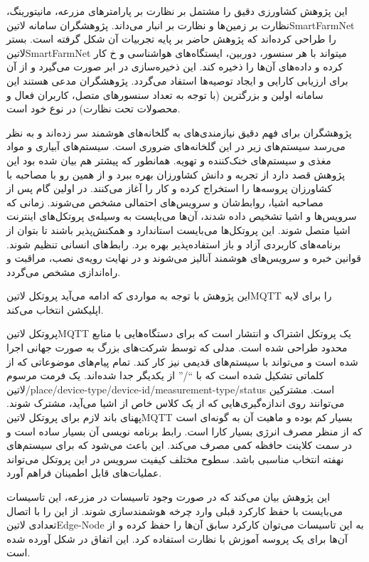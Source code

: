 این پژوهش کشاورزی دقیق را مشتمل بر نظارت بر پارامترهای مزرعه، مانیتورینگ، نظارت بر زمین‌ها و نظارت بر انبار می‌داند. پژوهشگران سامانه ‌لاتین{SmartFarmNet} را طراحی کرده‌اند که پژوهش حاضر بر پایه تجربیات آن شکل گرفته است.
بستر ‌لاتین{SmartFarmNet} میتواند با هر سنسور، دوربین، ایستگاه‌های هواشناسی و ‌خ کار کرده و داده‌های آن‌ها را ذخیره کند. این ذخیره‌سازی در ابر صورت می‌گیرد و از آن برای ارزیابی کارایی و ایجاد توصیه‌ها استفاد می‌گردد.
پژوهشگران مدعی هستند این سامانه اولین و بزرگترین (با توجه به تعداد سنسورهای متصل، کاربران فعال و محصولات تحت نظارت) در نوع خود است.

پژوهشگران برای فهم دقیق نیازمندی‌های به گلخانه‌های هوشمند سر زده‌اند و به نظر می‌رسد سیستم‌های زیر در این گلخانه‌های ضروری است. سیستم‌های آبیاری و مواد مغذی و سیستم‌های خنک‌کننده و تهویه.
همانطور که پیشتر هم بیان شده بود این پژوهش قصد دارد از تجربه و دانش کشاورزان بهره ببرد و از همین رو با مصاحبه با کشاورزان پروسه‌ها را استخراج کرده و کار را آغاز می‌کنند.
در اولین گام پس از مصاحبه اشیا، روابط‌شان و سرویس‌های احتمالی مشخص می‌شوند. زمانی که سرویس‌ها و اشیا تشخیص داده شدند، آن‌ها می‌بایست به وسیله‌ی پروتکل‌های اینترنت اشیا متصل شوند.
این پروتکل‌ها می‌بایست استاندارد و همکنش‌پذیر باشند تا بتوان از برنامه‌های کاربردی آزاد و باز استفاده‌پذیر بهره برد.
رابط‌های انسانی تنظیم شوند.
قوانین خبره و سرویس‌های هوشمند آنالیز می‌شوند و در نهایت رویه‌ی نصب، مراقبت و راه‌اندازی مشخص می‌گردد.

این پژوهش با توجه به مواردی که ادامه می‌آید پروتکل ‌لاتین{MQTT} را برای لایه اپلیکشن انتخاب می‌کند.

 پروتکل ‌لاتین{MQTT} یک پروتکل اشتراک و انتشار است که برای دستگاه‌هایی با منابع محدود طراحی شده است. مدلی که توسط شرکت‌های بزرگ به صورت جهانی اجرا شده است
و می‌تواند با سیستم‌های قدیمی نیز کار کند.
 تمام پیام‌های موضوعاتی که از کلماتی تشکیل شده است که با ``/'' از یکدیگر جدا شده‌اند. یک فرمت مرسوم ‌لاتین{/place/device-type/device-id/measurement-type/status}
است. مشترکین می‌توانند روی اندازه‌گیری‌هایی که از یک کلاس خاص از اشیا می‌آید، مشترک شوند.
 پهنای باند لازم برای پروتکل ‌لاتین{MQTT} بسیار کم بوده و ماهیت آن به گونه‌ای است که از منظر مصرف انرژی بسیار کارا است.
 رابط برنامه نویسی آن بسیار ساده است و در سمت کلاینت حافظه کمی مصرف می‌کند. این باعث می‌شود که برای سیستم‌های نهفته انتخاب مناسبی باشد.
 سطوح مختلف کیفیت سرویس در این پروتکل می‌تواند عملیات‌های قابل اطمینان فراهم آورد.

این پژوهش بیان می‌کند که در صورت وجود تاسیسات در مزرعه، این تاسیسات می‌بایست با حفظ کارکرد قبلی وارد چرخه هوشمند‌سازی شوند. از این را با اتصال تعدادی ‌لاتین{Edge-Node} به این تاسیسات می‌توان
کارکرد سابق آن‌ها را حفظ کرده و از آن‌ها برای یک پروسه آموزش با نظارت استفاده کرد. این اتفاق در شکل  آورده شده است.

